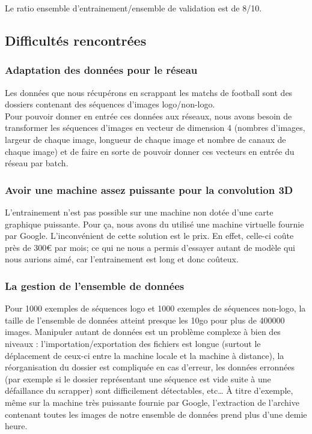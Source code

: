 \documentclass[11pt]{article}
\begin{document}
Le ratio ensemble d'entrainement/ensemble de validation est de 8/10.\\
\subsection{Difficultés rencontrées}
\label{sec:org826b600}
\subsubsection{Adaptation des données pour le réseau}
\label{sec:org4edfe1e}
Les données que nous récupérons en scrappant les matchs de football sont des dossiers contenant des séquences d'images logo/non-logo.\\
Pour pouvoir donner en entrée ces données aux réseaux, nous avons besoin de transformer les séquences d'images en vecteur de dimension 4 (nombres d'images, largeur de chaque image, longueur de chaque image et nombre de canaux de chaque image) et de faire en sorte de pouvoir donner ces vecteurs en entrée du réseau par batch.\\
\subsubsection{Avoir une machine assez puissante pour la convolution 3D}
\label{sec:orgf386ed7}
L'entrainement n'est pas possible sur une machine non dotée d'une carte graphique puissante. Pour ça, nous avons du utilisé une machine virtuelle fournie par Google. L'inconvénient de cette solution est le prix. En effet, celle-ci coûte près de 300€ par mois; ce qui ne nous a permis d'essayer autant de modèle qui nous aurions aimé, car l'entrainement est long et donc coûteux.\\
\subsubsection{La gestion de l'ensemble de données}
\label{sec:orgcd35e03}
Pour 1000 exemples de séquences logo et 1000 exemples de séquences non-logo, la taille de l'ensemble de données atteint presque les 10go pour plus de 400000 images. Manipuler autant de données est un problème complexe à bien des niveaux : l'importation/exportation des fichiers est longue (surtout le déplacement de ceux-ci entre la machine locale et la machine à distance), la réorganisation du dossier est compliquée en cas d'erreur, les données erronnées (par exemple si le dossier représentant une séquence est vide suite à une défaillance du scrapper) sont difficilement détectables, etc\ldots{} À titre d'exemple, même sur la machine très puissante fournie par Google, l'extraction de l'archive contenant toutes les images de notre ensemble de données prend plus d'une demie heure.\\
\newpage
\end{document}
